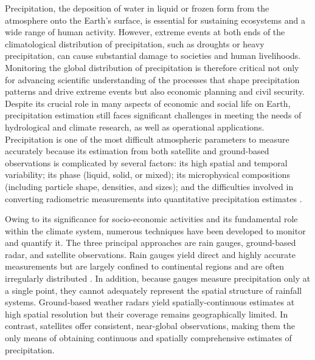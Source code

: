 \documentclass[11pt]{article}
\begin{document}
Precipitation, the deposition of water in liquid or frozen form from the
atmosphere onto the Earth's surface, is essential for sustaining ecosystems and
a wide range of human activity. However, extreme events at both ends of the
climatological distribution of precipitation, such as droughts or heavy
precipitation, can cause substantial damage to societies and human livelihoods.
Monitoring the global distribution of precipitation is therefore critical not
only for advancing scientific understanding of the processes that shape
precipitation patterns and drive extreme events but also economic planning and
civil security. Despite its crucial role in many aspects of economic and social
life on Earth, precipitation estimation still faces significant challenges in
meeting the needs of hydrological and climate research, as well as operational
applications. Precipitation is one of the most difficult atmospheric parameters
to measure accurately because its estimation from both satellite and ground-based
observations is complicated by several factors: its high spatial and temporal
variability; its phase (liquid, solid, or mixed); its microphysical compositions
(including particle shape, densities, and sizes); and the difficulties involved
in converting radiometric measurements into quantitative precipitation
estimates \citep{Levizzani2020Satellite}.

Owing to its significance for socio-economic activities and its fundamental role
within the climate system, numerous techniques have been developed to monitor
and quantify it. The three principal approaches are rain gauges, ground-based
radar, and satellite observations. Rain gauges yield direct and highly accurate
measurements but are largely confined to continental regions and are often
irregularly distributed \citep{Kidd2017RainGauges}. In addition, because gauges
measure precipitation only at a single point, they cannot adequately represent
the spatial structure of rainfall systems. Ground-based weather radars yield
spatially-continuous estimates at high spatial resolution but their coverage
remains geographically limited. In contrast, satellites offer consistent,
near-global observations, making them the only means of obtaining continuous and
spatially comprehensive estimates of precipitation.
\end{document}
